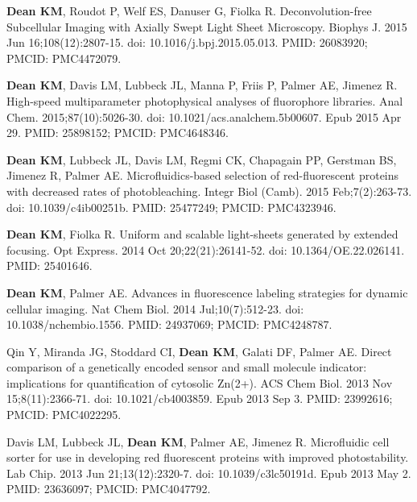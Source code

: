 \begin{etaremune}
\item \textbf{Dean KM}, Roudot P, Welf ES, Danuser G, Fiolka R. Deconvolution-free Subcellular Imaging with Axially Swept Light Sheet Microscopy. Biophys J. 2015 Jun 16;108(12):2807-15. doi: 10.1016/j.bpj.2015.05.013. PMID: 26083920; PMCID: PMC4472079.

\item \textbf{Dean KM}, Davis LM, Lubbeck JL, Manna P, Friis P, Palmer AE, Jimenez R. High-speed multiparameter photophysical analyses of fluorophore libraries. Anal Chem. 2015;87(10):5026-30. doi: 10.1021/acs.analchem.5b00607. Epub 2015 Apr 29. PMID: 25898152; PMCID: PMC4648346.

\item \textbf{Dean KM}, Lubbeck JL, Davis LM, Regmi CK, Chapagain PP, Gerstman BS, Jimenez R, Palmer AE. Microfluidics-based selection of red-fluorescent proteins with decreased rates of photobleaching. Integr Biol (Camb). 2015 Feb;7(2):263-73. doi: 10.1039/c4ib00251b. PMID: 25477249; PMCID: PMC4323946.

\item \textbf{Dean KM}, Fiolka R. Uniform and scalable light-sheets generated by extended focusing. Opt Express. 2014 Oct 20;22(21):26141-52. doi: 10.1364/OE.22.026141. PMID: 25401646.

\item \textbf{Dean KM}, Palmer AE. Advances in fluorescence labeling strategies for dynamic cellular imaging. Nat Chem Biol. 2014 Jul;10(7):512-23. doi: 10.1038/nchembio.1556. PMID: 24937069; PMCID: PMC4248787.

\item Qin Y, Miranda JG, Stoddard CI, \textbf{Dean KM}, Galati DF, Palmer AE. Direct comparison of a genetically encoded sensor and small molecule indicator: implications for quantification of cytosolic Zn(2+). ACS Chem Biol. 2013 Nov 15;8(11):2366-71. doi: 10.1021/cb4003859. Epub 2013 Sep 3. PMID: 23992616; PMCID: PMC4022295.

\item Davis LM, Lubbeck JL, \textbf{Dean KM}, Palmer AE, Jimenez R. Microfluidic cell sorter for use in developing red fluorescent proteins with improved photostability. Lab Chip. 2013 Jun 21;13(12):2320-7. doi: 10.1039/c3lc50191d. Epub 2013 May 2. PMID: 23636097; PMCID: PMC4047792.


\end{etaremune}
